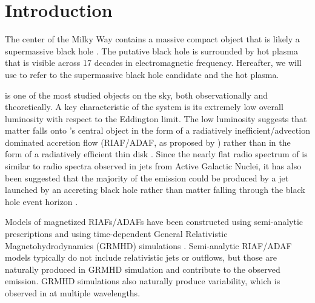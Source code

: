 \section{Introduction}
\label{sec:intro}

The center of the Milky Way contains a massive compact object that is likely a supermassive black hole \citep{2019Sci...365..664D, 2019A&A...625L..10G}.
The putative black hole is surrounded by hot plasma that is visible across 17 decades in electromagnetic frequency.
Hereafter, we will use \sgra to refer to the supermassive black hole candidate and the hot plasma.

\sgra is one of the most studied objects on the sky, both observationally and theoretically.
A key  characteristic of the \sgra system is its extremely low overall luminosity with respect to the Eddington limit.
The low luminosity suggests that matter falls onto \sgra's central object in the form of a radiatively inefficient/advection dominated accretion flow (RIAF/ADAF, as proposed by \citealt{1977ApJ...214..840I,1994ApJ...428L..13N, 1995ApJ...444..231N, 1995ApJ...452..710N, 1996A&AS..120C.287N, 1998ApJ...492..554N,2014ARA&A..52..529Y}) rather than in the form of a radiatively efficient thin disk \citep{1973A&A....24..337S}.
Since the nearly flat radio spectrum of \sgra is similar to radio spectra observed in jets from Active Galactic Nuclei, it has also been suggested that the majority of the \sgra emission could be produced by a jet launched by an accreting black hole rather than matter falling through the black hole event horizon \citep{1993A&A...278L...1F, 2000A&A...362..113F}.

Models of magnetized RIAFs/ADAFs have been constructed using semi-analytic prescriptions \citep[e.g.,][]{1995Natur.374..623N,2000ApJ...541..234O, 2009ApJ...697...45B,2011ApJ...735..110B} and using time-dependent General Relativistic Magnetohydrodynamics (GRMHD) simulations \citep[e.g.,][]{2000ApJ...528..462H, 2003ApJ...589..458D, 2003ApJ...589..444G, 2007CQGra..24S.235G, 2012ApJS..201....9F, 2014ApJ...796...22F, 2016ApJS..225...22W, 2017ApJS..231...17A, 2018JPhCS1031a2008O, Olivares2019, 2019ApJS..243...26P, Liska2019}.
Semi-analytic RIAF/ADAF models typically do not include relativistic jets or outflows, but those are naturally produced in GRMHD simulation and contribute to the observed emission.
GRMHD simulations also naturally produce variability, which is observed in \sgra at multiple wavelengths.


